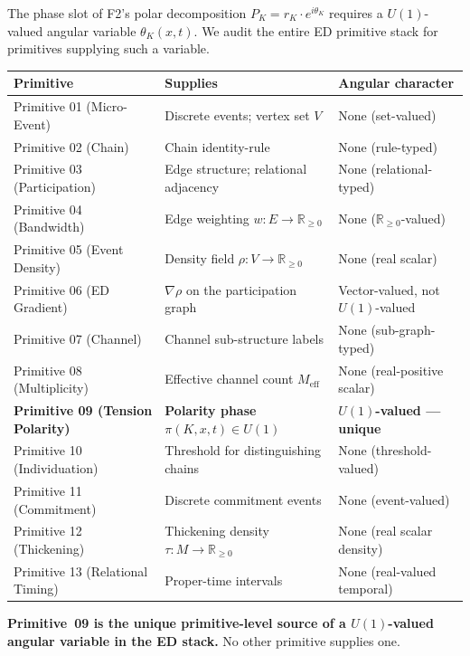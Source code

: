 \documentclass[11pt,a4paper]{article}
\begin{document}
The phase slot of F2's polar decomposition $P_K = r_K \cdot e^{i \theta_K}$ requires a $U(1)$-valued angular variable $\theta_K(x, t)$. We audit the entire ED primitive stack for primitives supplying such a variable.

\begin{center}
\begin{tabular}{lll}
\hline
Primitive & Supplies & Angular character \\
\hline
Primitive 01 (Micro-Event) & Discrete events; vertex set $V$ & None (set-valued) \\
Primitive 02 (Chain) & Chain identity-rule & None (rule-typed) \\
Primitive 03 (Participation) & Edge structure; relational adjacency & None (relational-typed) \\
Primitive 04 (Bandwidth) & Edge weighting $w : E \to \mathbb{R}_{\geq 0}$ & None ($\mathbb{R}_{\geq 0}$-valued) \\
Primitive 05 (Event Density) & Density field $\rho : V \to \mathbb{R}_{\geq 0}$ & None (real scalar) \\
Primitive 06 (ED Gradient) & $\nabla \rho$ on the participation graph & Vector-valued, not $U(1)$-valued \\
Primitive 07 (Channel) & Channel sub-structure labels & None (sub-graph-typed) \\
Primitive 08 (Multiplicity) & Effective channel count $M_\mathrm{eff}$ & None (real-positive scalar) \\
\textbf{Primitive 09 (Tension Polarity)} & \textbf{Polarity phase $\pi(K, x, t) \in U(1)$} & \textbf{$U(1)$-valued --- unique} \\
Primitive 10 (Individuation) & Threshold for distinguishing chains & None (threshold-valued) \\
Primitive 11 (Commitment) & Discrete commitment events & None (event-valued) \\
Primitive 12 (Thickening) & Thickening density $\tau : M \to \mathbb{R}_{\geq 0}$ & None (real scalar density) \\
Primitive 13 (Relational Timing) & Proper-time intervals & None (real-valued temporal) \\
\hline
\end{tabular}
\end{center}

\textbf{Primitive~09 is the unique primitive-level source of a $U(1)$-valued angular variable in the ED stack.} No other primitive supplies one.
\end{document}
